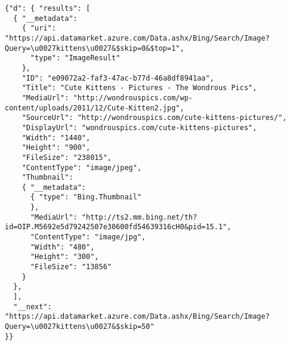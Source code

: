 \begin{verbatim}
{"d": { "results": [
  { "__metadata":
    { "uri": "https://api.datamarket.azure.com/Data.ashx/Bing/Search/Image?Query=\u0027kittens\u0027&$skip=0&$top=1",
      "type": "ImageResult"
    },
    "ID": "e09072a2-faf3-47ac-b77d-46a8df8941aa",
    "Title": "Cute Kittens - Pictures - The Wondrous Pics",
    "MediaUrl": "http://wondrouspics.com/wp-content/uploads/2011/12/Cute-Kitten2.jpg",
    "SourceUrl": "http://wondrouspics.com/cute-kittens-pictures/",
    "DisplayUrl": "wondrouspics.com/cute-kittens-pictures",
    "Width": "1440",
    "Height": "900",
    "FileSize": "238015",
    "ContentType": "image/jpeg",
    "Thumbnail":
    { "__metadata":
      { "type": "Bing.Thumbnail"
      },
      "MediaUrl": "http://ts2.mm.bing.net/th?id=OIP.M5692e5d79242507e30600fd54639316cH0&pid=15.1",
      "ContentType": "image/jpg",
      "Width": "480",
      "Height": "300",
      "FileSize": "13856"
    }
  },
  ],
  "__next": "https://api.datamarket.azure.com/Data.ashx/Bing/Search/Image?Query=\u0027kittens\u0027&$skip=50"
}}
\end{verbatim}



